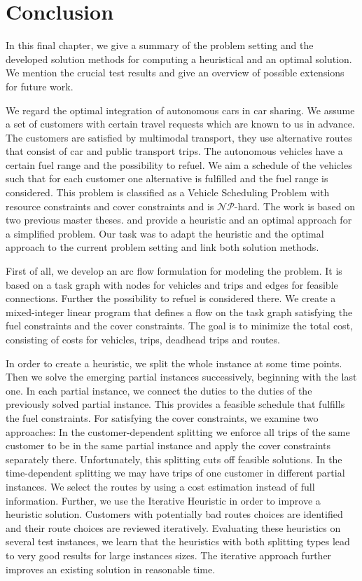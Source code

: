 \chapter{Conclusion}
\label{ch:conclusion}

In this final chapter, we give a summary of the problem setting and the developed solution methods for computing a heuristical and an optimal solution. We mention the crucial test results and give an overview of possible extensions for future work.

We regard the optimal integration of autonomous cars in car sharing. We assume a set of customers with certain travel requests which are known to us in advance. The customers are satisfied by multimodal transport, \ie they use alternative routes that consist of car and public transport trips. The autonomous vehicles have a certain fuel range and the possibility to refuel. We aim a schedule of the vehicles such that for each customer one alternative is fulfilled and the fuel range is considered. This problem is classified as a Vehicle Scheduling Problem with resource constraints and cover constraints and is $\mathcal{NP}$-hard. The work is based on two previous master theses. \cite{Knoll} and \cite{Kaiser} provide a heuristic and an optimal approach for a simplified problem. Our task was to adapt the heuristic and the optimal approach to the current problem setting and link both solution methods.

First of all, we develop an arc flow formulation for modeling the problem. It is based on a task graph with nodes for vehicles and trips and edges for feasible connections. Further the possibility to refuel is considered there. We create a mixed-integer linear program that defines a flow on the task graph satisfying the fuel constraints and the cover constraints. The goal is to minimize the total cost, consisting of costs for vehicles, trips, deadhead trips and routes.

In order to create a heuristic, we split the whole instance at some time points. Then we solve the emerging partial instances successively, beginning with the last one. In each partial instance, we connect the duties to the duties of the previously solved partial instance. This provides a feasible schedule that fulfills the fuel constraints. For satisfying the cover constraints, we examine two approaches: In the customer-dependent splitting we enforce all trips of the same customer to be in the same partial instance and apply the cover constraints separately there. Unfortunately, this splitting cuts off feasible solutions. In the time-dependent splitting we may have trips of one customer in different partial instances. We select the routes by using a cost estimation instead of full information. Further, we use the Iterative Heuristic in order to improve a heuristic solution. Customers with potentially bad routes choices are identified and their route choices are reviewed iteratively. Evaluating these heuristics on several test instances, we learn that the heuristics with both splitting types lead to very good results for large instances sizes. The iterative approach further improves an existing solution in reasonable time.

